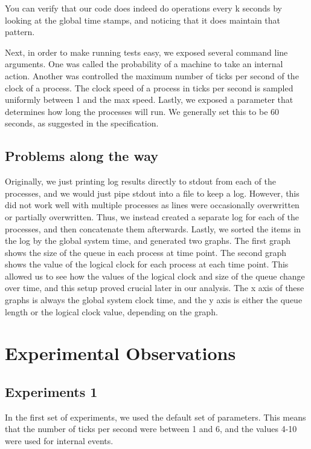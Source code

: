 \documentclass[journal]{IEEEtran}
\begin{document}
You can verify that our code does indeed do operations every k seconds by looking at the global time stamps, and noticing that it does maintain that pattern.

Next, in order to make running tests easy, we exposed several command line arguments. One was called the probability of a machine to take an internal action.  Another was controlled the maximum number of ticks per second of the clock of a process. The clock speed of a process in ticks per second is sampled uniformly between 1 and the max speed. Lastly, we exposed a parameter that determines how long the processes will run. We generally set this to be 60 seconds, as suggested in the specification.

\subsection{Problems along the way}
Originally, we just printing log results directly to stdout from each of the processes, and we would just pipe stdout into a file to keep a log. However, this did not work well with multiple processes as lines were occasionally overwritten or partially overwritten. Thus, we instead created a separate log for each of the processes, and then concatenate them afterwards. Lastly, we sorted the items in the log by the global system time, and generated two graphs. The first graph shows the size of the queue in each process at time point. The second graph shows the value of the logical clock for each process at each time point. This allowed us to see how the values of the logical clock and size of the queue change over time, and this setup proved crucial later in our analysis. The x axis of these graphs is always the global system clock time, and the y axis is either the queue length or the logical clock value, depending on the graph.

\section{Experimental Observations}

\subsection{Experiments 1}

In the first set of experiments, we used the default set of parameters.  This means that the number of ticks per second were between 1 and 6, and the values 4-10 were used for internal events.
\end{document}
